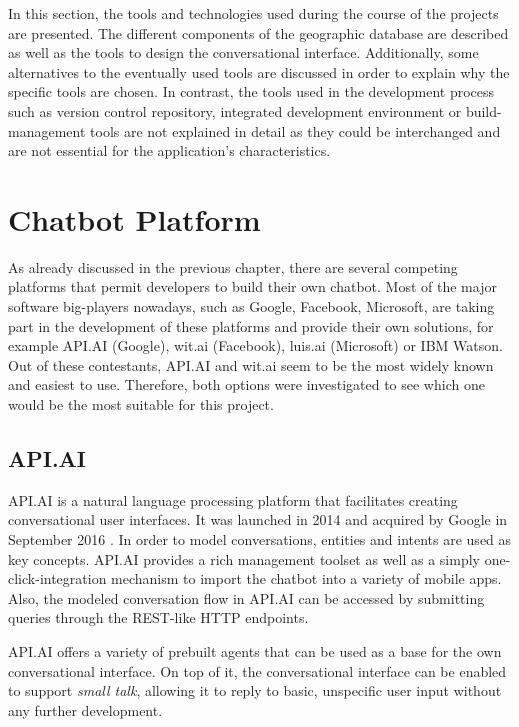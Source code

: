 
In this section, the tools and technologies used during the course of the projects are presented. The different components of the geographic database are described as well as the tools to design the conversational interface. Additionally, some alternatives to the eventually used tools are discussed in order to explain why the specific tools are chosen.
In contrast, the tools used in the development process such as version control repository, integrated development environment or build-management tools are not explained in detail as they could be interchanged and are not essential for the application’s characteristics.

\section{Chatbot Platform}
As already discussed in the previous chapter, there are several competing platforms that permit developers to build their own chatbot. Most of the major software big-players nowadays, such as Google, Facebook, Microsoft, are taking part in the development of these platforms and provide their own solutions, for example API.AI (Google), wit.ai (Facebook), luis.ai (Microsoft) or IBM Watson. Out of these contestants, API.AI and wit.ai seem to be the most widely known and easiest to use. Therefore, both options were investigated to see which one would be the most suitable for this project. 
\subsection{API.AI}
API.AI \cite{apiai} is a natural language processing platform that facilitates creating conversational user interfaces. It was launched in 2014 and acquired by Google in September 2016 \cite{apiai:google}. In order to model conversations, entities and intents are used as key concepts. API.AI provides a rich management toolset as well as a simply one-click-integration mechanism to import the chatbot into a variety of mobile apps. Also, the modeled conversation flow in API.AI can be accessed by submitting queries through the REST-like HTTP endpoints. 

API.AI offers a variety of prebuilt agents that can be used as a base for the own conversational interface. On top of it, the conversational interface can be enabled to support \textit{small talk}, allowing it to reply to basic, unspecific user input without any further development.

